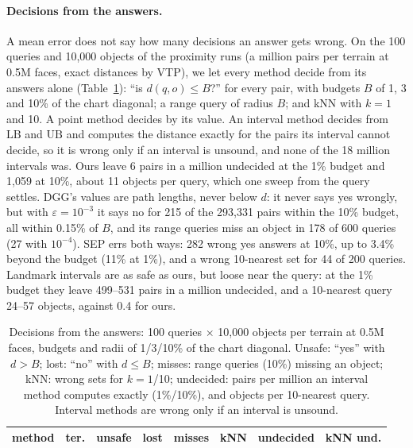 \documentclass[sigconf,nonacm,screen]{acmart}
\newcommand{\LB}{\mathrm{LB}}
\newcommand{\UB}{\mathrm{UB}}
\newcommand{\eps}{\varepsilon}
\begin{document}
\paragraph{Decisions from the answers.}
A mean error does not say how many decisions an answer gets wrong. On the 100 queries and 10,000 objects of the
proximity runs (a million pairs per terrain at 0.5M faces, exact distances by VTP), we let every method decide
from its answers alone (Table~\ref{tab:decisions}): ``is $d(q,o)\le B$?'' for every pair, with budgets $B$ of 1, 3 and
10\% of the chart diagonal; a range query of radius $B$; and kNN with $k=1$ and 10. A point method decides by its
value. An interval method decides from $\LB$ and $\UB$ and computes the distance exactly for the pairs its interval
cannot decide, so it is wrong only if an interval is unsound, and none of the 18 million intervals was. Ours leave 6
pairs in a million undecided at the 1\% budget and 1,059 at 10\%, about 11 objects per query, which one sweep from
the query settles. DGG's values are path lengths, never below $d$: it never says yes wrongly, but with
$\eps=10^{-3}$ it says no for 215 of the 293,331 pairs within the 10\% budget, all within 0.15\% of $B$, and its
range queries miss an object in 178 of 600 queries (27 with $10^{-4}$). SEP errs both ways: 282 wrong yes answers
at 10\%, up to 3.4\% beyond the budget (11\% at 1\%), and a wrong 10-nearest set for 44 of 200 queries. Landmark
intervals are as safe as ours, but loose near the query: at the 1\% budget they leave 499--531 pairs in a million
undecided, and a 10-nearest query 24--57 objects, against 0.4 for ours.

\begin{table}[t]
\caption{Decisions from the answers: 100 queries $\times$ 10,000 objects per terrain at 0.5M faces, budgets and radii
of 1/3/10\% of the chart diagonal. Unsafe: ``yes'' with $d>B$; lost: ``no'' with $d\le B$; misses: range queries (10\%)
missing an object; kNN: wrong sets for $k=1$/10; undecided: pairs per million an interval method computes exactly
(1\%/10\%), and objects per 10-nearest query. Interval methods are wrong only if an interval is unsound.}
\label{tab:decisions}
\small
\setlength{\tabcolsep}{2.5pt}
\begin{tabular}{@{}lrrrrrrr@{}}
\toprule
method & ter. & unsafe & lost & misses & kNN & undecided & kNN und.\\
\midrule

\end{tabular}
\end{table}
\end{document}
